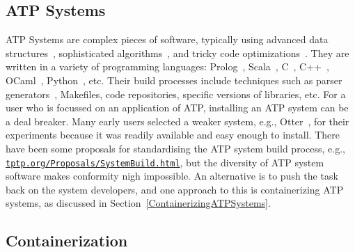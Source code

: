 \documentclass{easychair}
\begin{document}
\subsection{ATP Systems}
\label{ATPSystems}

ATP Systems are complex pieces of software, typically using advanced data structures~\cite{Sch13}, 
sophisticated algorithms~\cite{Vor01}, and tricky code optimizations~\cite{Sch06}.
They are written in a variety of programming languages: Prolog~\cite{Ott23,Hol23}, 
Scala~\cite{SB18}, C~\cite{SCV19}, C++~\cite{RV02-AICOMM}, OCaml~\cite{Kor06}, Python~\cite{SP20}, 
etc.
Their build processes include techniques such as parser generators~\cite{Ste21}, Makefiles,
code repositories, specific versions of libraries, etc.
For a user who is focussed on an application of ATP,
installing an ATP system can be a deal breaker. 
Many early users selected a weaker system, e.g., Otter~\cite{McC03-Otter}, for their experiments 
because it was readily available and easy enough to install.
There have been some proposals for standardising the ATP system build process, e.g.,
\href{https://tptp.org/Proposals/SystemBuild.html}{\tt tptp.org/Proposals/SystemBuild.html}, 
but the diversity of ATP system software makes conformity nigh impossible.
An alternative is to push the task back on the system developers, and one approach to this is
containerizing ATP systems, as discussed in Section~\ref{ContainerizingATPSystems}.

\subsection{Containerization}
\label{Containerization}
\end{document}
